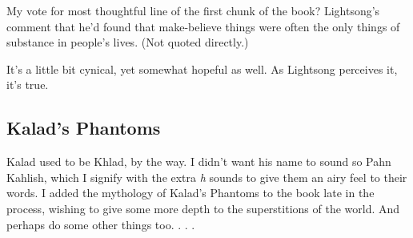 My vote for most thoughtful line of the first chunk of the book? Lightsong’s comment that he’d found that make-believe things were often the only things of substance in people’s lives. (Not quoted directly.)

It’s a little bit cynical, yet somewhat hopeful as well. As Lightsong perceives it, it’s true.

\subsection*{Kalad’s Phantoms}

Kalad used to be Khlad, by the way. I didn’t want his name to sound so Pahn Kahlish, which I signify with the extra \textit{h} sounds to give them an airy feel to their words. I added the mythology of Kalad’s Phantoms to the book late in the process, wishing to give some more depth to the superstitions of the world. And perhaps do some other things too. . . .



